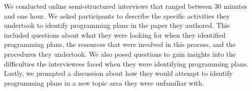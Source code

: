 


We conducted online semi-structured interviews that ranged between 30 minutes and one hour. 
We asked participants to describe the specific activities they undertook to identify programming plans in the paper they authored. This included questions about what they were looking for when they identified programming plans, the resources that were involved in this process, and the procedures they undertook.
We also posed questions to gain insights into the difficulties the interviewees faced when they were identifying programming plans.
Lastly, we prompted a discussion about how they would attempt to identify programming plans in a new topic area they were unfamiliar with.

